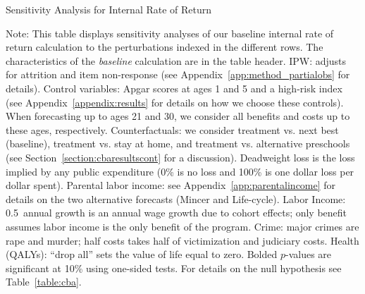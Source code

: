 \begin{table}
\begin{threeparttable}
\caption{Sensitivity Analysis for Internal Rate of Return}
\label{table:irrsens}
\centering
\scriptsize

\begin{tablenotes}
\scriptsize
\item Note: This table displays sensitivity analyses of our baseline internal rate of return calculation to the perturbations indexed in the different rows. The characteristics of the \textit{baseline} calculation are in the table header. IPW: adjusts for attrition and item non-response (see  Appendix~\ref{app:method_partialobs} for details). Control variables: Apgar scores at ages 1 and 5 and a high-risk index (see  Appendix~\ref{appendix:results} for details on how we choose these controls). When forecasting up to ages 21 and 30, we consider all benefits and costs up to these ages, respectively. Counterfactuals: we consider treatment vs. next best (baseline), treatment vs. stay at home, and treatment vs. alternative preschools (see Section~\ref{section:cbaresultscont} for a discussion). Deadweight loss is the loss implied by any public expenditure (0\% is no loss and 100\% is one dollar loss per dollar spent). Parental labor income: see  Appendix~\ref{app:parentalincome} for details on the two alternative forecasts (Mincer and Life-cycle). Labor Income: 0.5\ annual growth is an annual wage growth due to cohort effects; only benefit assumes labor income is the only benefit of the program. Crime: major crimes are rape and murder; half costs takes half of victimization and judiciary costs. Health (QALYs): ``drop all'' sets the value of life equal to zero. Bolded $p$-values are significant at 10\% using one-sided tests. For details on the null hypothesis see Table~\ref{table:cba}.
\end{tablenotes}
\end{threeparttable}
\end{table}

